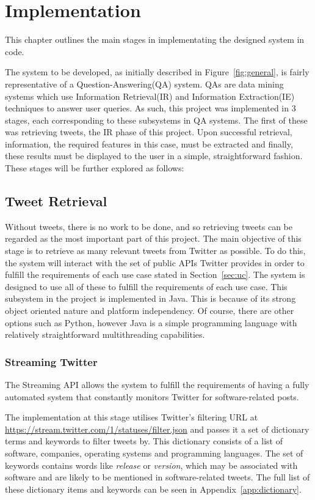 \chapter{Implementation}
\label{cha:impl}
This chapter outlines the main stages in implementating the designed system in code.


The system to be developed, as initially described in Figure~\ref{fig:general}, is fairly representative of a Question-Answering(QA) system. QAs are data mining systems which use Information Retrieval(IR) and Information Extraction(IE) techniques to answer user queries. As such, this project was implemented in 3 stages, each corresponding to these subsystems in QA systems. The first of these was retrieving tweets, the IR phase of this project. Upon successful retrieval, information, the required features in this case, must be extracted and finally, these results must be displayed to the user in a simple, straightforward fashion. These stages will be further explored as follows:

\java
\section{Tweet Retrieval}
Without tweets, there is no work to be done, and so retrieving tweets can be regarded as the most important part of this project. The main objective of this stage is to retrieve as many relevant tweets from Twitter as possible. To do this, the system will interact with the set of public APIs Twitter provides in order to fulfill the requirements of each use case stated in Section~\ref{sec:uc}. The system is designed to use all of these to fulfill the requirements of each use case. This subsystem in the project is implemented in Java. This is because of its strong object oriented nature and platform independency. Of course, there are other options such as Python, however Java is a simple programming language with relatively straightforward multithreading capabilities.

\subsection{Streaming Twitter}
The Streaming API allows the system to fulfill the requirements of having a fully automated system that constantly monitors Twitter for software-related posts. 

The implementation at this stage utilises Twitter's filtering URL at \url{https://stream.twitter.com/1/statuses/filter.json} and passes it a set of dictionary terms and keywords to filter tweets by. This dictionary consists of a list of software, companies, operating systems and programming languages. The set of keywords contains words like \emph{release} or \emph{version}, which may be associated with software and are likely to be mentioned in software-related tweets. The full list of these dictionary items and keywords can be seen in Appendix~\ref{app:dictionary}.

